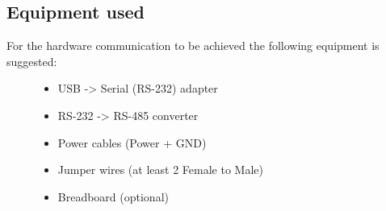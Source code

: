 \documentclass[letterpaper,10pt,english]{sphinxmanual}
\begin{document}
\subsection{Equipment used}
\label{hardware:equipment-used}\begin{description}
\item[{For the hardware communication to be achieved the following equipment is suggested:}] \leavevmode\begin{itemize}
\item {} 
USB    -\textgreater{}  Serial (RS-232) adapter

\item {} 
RS-232 -\textgreater{}  RS-485 converter

\item {} 
Power cables (Power + GND)

\item {} 
Jumper wires (at least 2 Female to Male)

\item {} 
Breadboard (optional)

\end{itemize}

\end{description}
\end{document}
